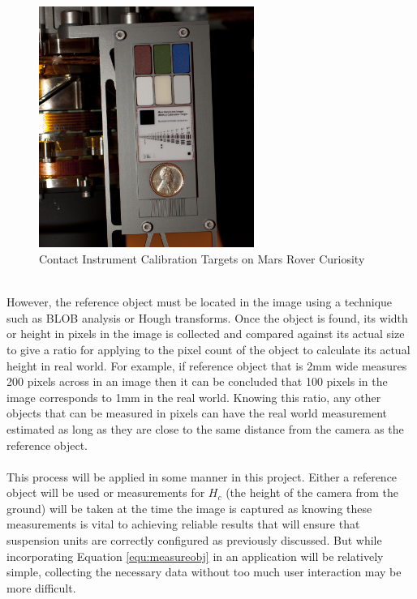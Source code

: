 	\begin{figure}[h!]
		\centering
		\includegraphics[width=7cm]{../images/curiosity_calibration_chart.jpg}
		\caption{Contact Instrument Calibration Targets on Mars Rover Curiosity \citep{curiosity_image_calibration}}
		\label{fig:curiosity_calibration_chart}
	\end{figure}\\
	However, the reference object must be located in the image using a technique such as  BLOB analysis or Hough transforms. Once the object is found, its width or height in pixels in the image is collected and compared against its actual size to give a ratio for applying to the pixel count of the object to calculate its actual height in real world. For example, if reference object that is 2mm wide measures 200 pixels across in an image then it can be concluded that 100 pixels in the image corresponds to 1mm in the real world. Knowing this ratio, any other objects that can be measured in pixels can have the real world measurement estimated as long as they are close to the same distance from the camera as the reference object.
	\\\\
	This process will be applied in some manner in this project. Either a reference object will be used or measurements for $H_c$ (the height of the camera from the ground) will be taken at the time the image is captured as knowing these measurements is vital to achieving reliable results that will ensure that suspension units are correctly configured as previously discussed. But while incorporating Equation \ref{equ:measureobj} in an application will be relatively simple, collecting the necessary data without too much user interaction may be more difficult.